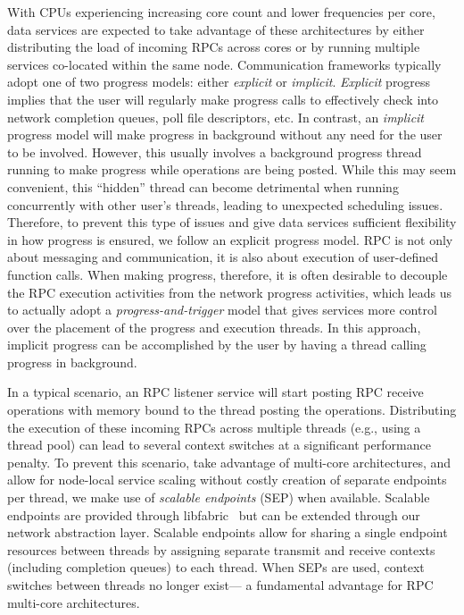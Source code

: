 \documentclass[11pt]{article}
\begin{document}
With CPUs experiencing increasing core count and lower frequencies per
core, data services are expected to take advantage of these architectures
by either distributing the load of incoming RPCs across cores or by
running multiple services co-located within the same node.
%
Communication
frameworks typically adopt one of two progress models: either \textit{explicit} or
\textit{implicit}. \textit{Explicit} progress implies that the user will regularly
make progress calls to effectively check into network completion queues, poll
file descriptors, etc. In contrast, an \textit{implicit} progress model will 
make progress in background without any need for the user to be involved.
However, this usually involves a background progress thread 
running to make progress while operations are being posted. While
this may seem convenient, this ``hidden'' thread can become detrimental when
running concurrently with other user's threads, leading to unexpected scheduling
issues.
%
Therefore, to prevent this type of issues and give data services sufficient
flexibility in how progress is ensured, we follow an explicit progress
model.
%
RPC is not only about messaging and communication, it is also about
execution of user-defined function calls. When making progress, therefore, it is
often desirable to decouple the RPC execution activities from the network progress activities,
which leads us to actually adopt a \textit{progress-and-trigger} model
that gives services more control over the placement of the progress and
execution threads.
%
In this approach, implicit progress can be accomplished
by the user by having a thread calling progress in background. 

In a typical scenario, an RPC listener service will start posting RPC receive
operations with memory bound to the thread posting the operations.
%
Distributing the execution of these incoming RPCs across multiple threads
(e.g., using a thread pool) can lead to several context switches
at a significant performance penalty. To prevent this scenario, take
advantage of multi-core architectures, and allow for node-local service scaling
without costly creation of separate endpoints per thread, we make
use of \textit{scalable endpoints} (SEP) when available.
%
Scalable endpoints are provided through libfabric~\cite{Grun2015} but
can be extended through our network abstraction layer.
Scalable endpoints allow for
sharing a single endpoint resources between threads by assigning separate
transmit and receive contexts (including completion queues) to each thread. When SEPs
are used, context switches between threads no longer exist---
a fundamental advantage for RPC multi-core architectures.
\end{document}
